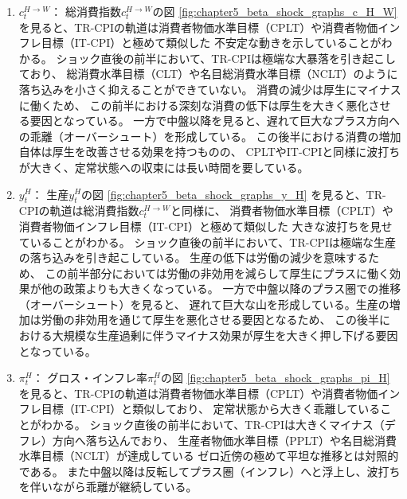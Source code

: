 \begin{enumerate}
    \item
    \label{itm:chapter5_beta_shock_policies_tr_cpi_c_H_W}
        \(c_t^{H\to W}\)：
        総消費指数\(c_t^{H\to W}\)の図
        \ref{fig:chapter5_beta_shock_graphs_c_H_W}
        を見ると、TR-CPIの軌道は消費者物価水準目標（CPLT）や消費者物価インフレ目標（IT-CPI）と極めて類似した
        不安定な動きを示していることがわかる。
        ショック直後の前半において、TR-CPIは極端な大暴落を引き起こしており、
        総消費水準目標（CLT）や名目総消費水準目標（NCLT）のように落ち込みを小さく抑えることができていない。
        消費の減少は厚生にマイナスに働くため、
        この前半における深刻な消費の低下は厚生を大きく悪化させる要因となっている。
        一方で中盤以降を見ると、遅れて巨大なプラス方向への乖離（オーバーシュート）を形成している。
        この後半における消費の増加自体は厚生を改善させる効果を持つものの、
        CPLTやIT-CPIと同様に波打ちが大きく、定常状態への収束には長い時間を要している。
    \item
    \label{itm:chapter5_beta_shock_policies_tr_cpi_y_H}
        \(y_t^H\)：
        生産\(y_t^H\)の図
        \ref{fig:chapter5_beta_shock_graphs_y_H}
        を見ると、TR-CPIの軌道は総消費指数\(c_t^{H\to W}\)と同様に、
        消費者物価水準目標（CPLT）や消費者物価インフレ目標（IT-CPI）と極めて類似した
        大きな波打ちを見せていることがわかる。
        ショック直後の前半において、TR-CPIは極端な生産の落ち込みを引き起こしている。
        生産の低下は労働の減少を意味するため、
        この前半部分においては労働の非効用を減らして厚生にプラスに働く効果が他の政策よりも大きくなっている。
        一方で中盤以降のプラス圏での推移（オーバーシュート）を見ると、
        遅れて巨大な山を形成している。生産の増加は労働の非効用を通じて厚生を悪化させる要因となるため、
        この後半における大規模な生産過剰に伴うマイナス効果が厚生を大きく押し下げる要因となっている。
    \item
    \label{itm:chapter5_beta_shock_policies_tr_cpi_pi_H}
        \(\pi_t^H\)：
        グロス・インフレ率\(\pi_t^H\)の図
        \ref{fig:chapter5_beta_shock_graphs_pi_H}
        を見ると、TR-CPIの軌道は消費者物価水準目標（CPLT）や消費者物価インフレ目標（IT-CPI）と類似しており、
        定常状態から大きく乖離していることがわかる。
        ショック直後の前半において、TR-CPIは大きくマイナス（デフレ）方向へ落ち込んでおり、
        生産者物価水準目標（PPLT）や名目総消費水準目標（NCLT）が達成している
        ゼロ近傍の極めて平坦な推移とは対照的である。
        また中盤以降は反転してプラス圏（インフレ）へと浮上し、波打ちを伴いながら乖離が継続している。

\end{enumerate}
